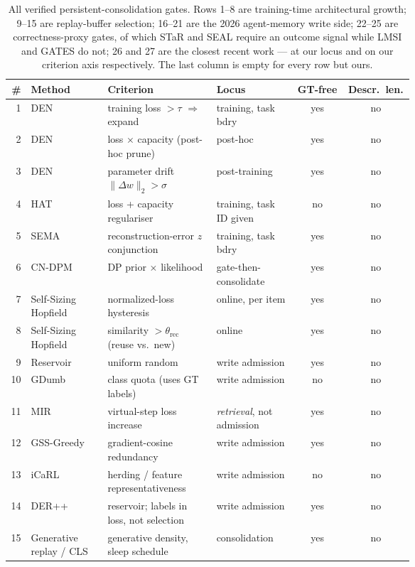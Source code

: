 \documentclass[11pt]{article}
\begin{document}
\begin{table}[h]
\centering\scriptsize
\setlength{\tabcolsep}{3.5pt}
\caption{All verified persistent-consolidation gates. Rows 1--8 are training-time
architectural growth; 9--15 are replay-buffer selection; 16--21 are the 2026 agent-memory
write side; 22--25 are correctness-proxy gates, of which STaR and SEAL require an outcome
signal while LMSI and GATES do not; 26 and 27 are the closest recent work --- at our locus
and on our criterion axis respectively. The last column is empty for every row but ours.}
\label{tab:full}
\begin{tabular}{@{}rp{0.19\linewidth}p{0.27\linewidth}p{0.20\linewidth}cc@{}}
\toprule
\# & \textbf{Method} & \textbf{Criterion} & \textbf{Locus} & \textbf{GT-free} & \textbf{Descr.\ len.} \\
\midrule
1  & DEN & training loss $>\tau$ $\Rightarrow$ expand & training, task bdry & yes & no \\
2  & DEN & loss $\times$ capacity (post-hoc prune) & post-hoc & yes & no \\
3  & DEN & parameter drift $\lVert\Delta w\rVert_2 > \sigma$ & post-training & yes & no \\
4  & HAT & loss + capacity regulariser & training, task ID given & no & no \\
5  & SEMA & reconstruction-error $z$ conjunction & training, task bdry & yes & no \\
6  & CN-DPM & DP prior $\times$ likelihood & gate-then-consolidate & yes & no \\
7  & Self-Sizing Hopfield & normalized-loss hysteresis & online, per item & yes & no \\
8  & Self-Sizing Hopfield & similarity $>\theta_{\text{rec}}$ (reuse vs.\ new) & online & yes & no \\
9  & Reservoir & uniform random & write admission & yes & no \\
10 & GDumb & class quota (uses GT labels) & write admission & no & no \\
11 & MIR & virtual-step loss increase & \emph{retrieval}, not admission & yes & no \\
12 & GSS-Greedy & gradient-cosine redundancy & write admission & yes & no \\
13 & iCaRL & herding / feature representativeness & write admission & no & no \\
14 & DER++ & reservoir; labels in loss, not selection & write admission & yes & no \\
15 & Generative replay / CLS & generative density, sleep schedule & consolidation & yes & no \\

\end{tabular}
\end{table}
\end{document}

